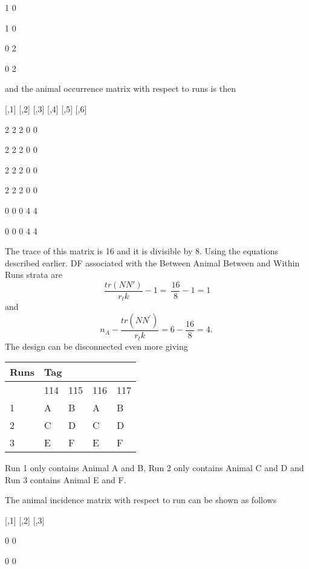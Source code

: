     1    0

    1    0

    0    2

    0    2

\noindent 

\noindent and the animal occurrence matrix with respect to runs is then 

     [,1] [,2] [,3] [,4] [,5] [,6]

    2    2    2    0    0

    2    2    2    0    0

    2    2    2    0    0

    2    2    2    0    0

    0    0    0    4    4

    0    0    0    4    4

\noindent 

\noindent The trace of this matrix is 16 and it is divisible by 8. Using the equations described earlier. DF associated with the Between Animal Between and Within Runs strata are  
\[\frac{tr(NN')}{r_tk}-1=\ \frac{16}{8}-1=1\] 
and
\[n_A-\frac{tr\left(NN^'\right)}{r_tk}=6-\frac{16}{8}=4.\ \] 
The design can be disconnected even more giving

\begin{tabular}{|p{0.3in}|p{0.3in}|p{0.3in}|p{0.3in}|p{0.3in}|} \hline 
Runs & \multicolumn{4}{|p{1.3in}|}{Tag} \\ \hline 
 & 114 & 115 & 116 & 117 \\ \hline 
1 & A & B & A & B \\ \hline 
2 & C & D & C & D \\ \hline 
3 & E & F & E & F \\ \hline 
\end{tabular}



\noindent Run 1 only contains Animal A and B, Run 2 only contains Animal C and D and Run 3 contains Animal E and F. 

\noindent \eject 

\noindent The animal incidence matrix with respect to run can be shown as follows

     [,1] [,2] [,3]

    0    0

    0    0

